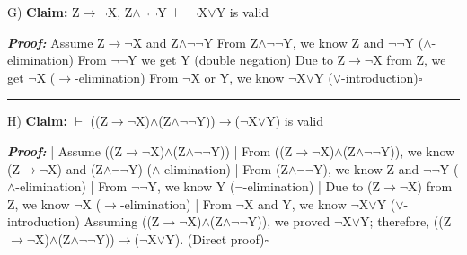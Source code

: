 \documentclass{article}
\begin{document}
G) \textbf{Claim: } Z$\rightarrow$$\neg$X, Z$\wedge$$\neg$$\neg$Y $\vdash$ $\neg$X$\lor$Y is valid\newline

\textbf{\textit{Proof: }}\newline
Assume Z$\rightarrow$$\neg$X and Z$\wedge$$\neg$$\neg$Y\newline
From Z$\wedge$$\neg$$\neg$Y, we know Z and $\neg$$\neg$Y ($\wedge$-elimination)\newline
From $\neg$$\neg$Y we get Y (double negation)\newline
Due to Z$\rightarrow$$\neg$X from Z, we get $\neg$X ($\rightarrow$-elimination)\newline
From $\neg$X or Y, we know $\neg$X$\lor$Y ($\lor$-introduction)$\square$\newline\rule{10cm}{1pt}\newline



H) \textbf{Claim: } $\vdash$ ((Z$\rightarrow$$\neg$X)$\wedge$(Z$\wedge$$\neg$$\neg$Y))$\rightarrow$($\neg$X$\lor$Y) is valid\newline

\textbf{\textit{Proof: }}\newline
|	Assume ((Z$\rightarrow$$\neg$X)$\wedge$(Z$\wedge$$\neg$$\neg$Y))\newline
|	From ((Z$\rightarrow$$\neg$X)$\wedge$(Z$\wedge$$\neg$$\neg$Y)), we know (Z$\rightarrow$$\neg$X) and (Z$\wedge$$\neg$$\neg$Y) ($\wedge$-elimination)\newline
|	From (Z$\wedge$$\neg$$\neg$Y), we know Z and $\neg$$\neg$Y ($\wedge$-elimination)\newline
|	From $\neg$$\neg$Y, we know Y ($\neg$-elimination)\newline
|	Due to (Z$\rightarrow$$\neg$X) from Z, we know $\neg$X ($\rightarrow$-elimination)\newline
|	From $\neg$X and Y, we know $\neg$X$\lor$Y ($\lor$-introduction)\newline
Assuming ((Z$\rightarrow$$\neg$X)$\wedge$(Z$\wedge$$\neg$$\neg$Y)), we proved $\neg$X$\lor$Y; therefore, ((Z$\rightarrow$$\neg$X)$\wedge$(Z$\wedge$$\neg$$\neg$Y))$\rightarrow$($\neg$X$\lor$Y). (Direct proof)$\square$
\end{document}
